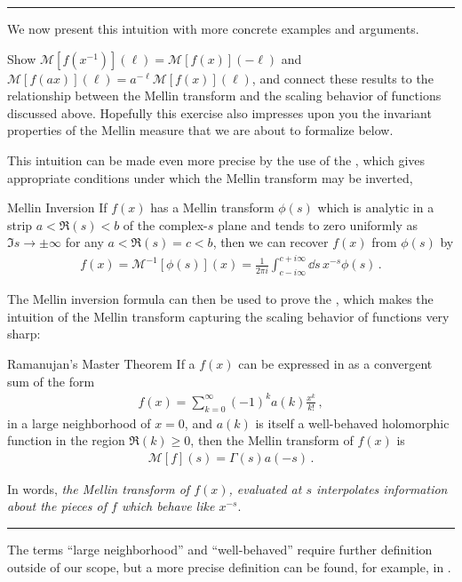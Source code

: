 \vspace{7pt}
\hrule
\vspace{7pt}


We now present this intuition with more concrete examples and arguments.

\begin{exercise}
    Show \(\mathcal{M}[f(x^{-1})](\ell) = \mathcal{M}[f(x)](-\ell)\) and \(\mathcal{M}[f(a x)](\ell) = a^{-\ell} \mathcal{M}[f(x)](\ell)\), and connect these results to the relationship between the Mellin transform and the scaling behavior of functions discussed above.
    Hopefully this exercise also impresses upon you the invariant properties of the Mellin measure that we are about to formalize below.
\end{exercise}


This intuition can be made even more precise by the use of the , which gives appropriate conditions under which the Mellin transform may be inverted,
\begin{proposition}{Mellin Inversion}{}
    If \(f(x)\) has a Mellin transform \(\phi(s)\) which is analytic in a strip \(a < \Re(s) < b\) of the complex-\(s\) plane and tends to zero uniformly as \(\Im s \to \pm \infty\) for any \(a < \Re(s) = c < b\), then we can recover \(f(x)\) from \(\phi(s)\) by
    \begin{align}
        f(x) = \mathcal{M}^{-1}[\phi(s)](x)
        =
        \frac{1}{2\pi i}
        \int_{c-i\infty}^{c+i \infty}
        \dd s
        \,
        x^{-s} \phi(s)
        \,.
    \end{align}
\end{proposition}
%
The Mellin inversion formula can then be used to prove the , which makes the intuition of the Mellin transform capturing the scaling behavior of functions very sharp:
\begin{proposition}{Ramanujan's Master Theorem}{}
    If a \(f(x)\) can be expressed in as a convergent sum of the form
    \begin{align}
        f(x) = \sum_{k = 0}^\infty (-1)^k a(k) \frac{x^k}{k!}
        \,,
    \end{align}
    in a large neighborhood of \(x = 0\), and \(a(k)\) is itself a well-behaved holomorphic function in the region \(\Re(k) \geq 0\), then the Mellin transform of \(f(x)\) is
    \begin{align}
        \mathcal{M}[f](s)
        =
        \Gamma(s) a(-s)
        \,.
    \end{align}

    In words, \textit{the Mellin transform of \(f(x)\), evaluated at \(s\) interpolates information about the pieces of \(f\) which behave like \(x^{-s}\)}.

    \vspace{7pt}
    \hrule
    \vspace{7pt}

    The terms ``large neighborhood'' and ``well-behaved'' require further definition outside of our scope, but a more precise definition can be found, for example, in .
\end{proposition}
